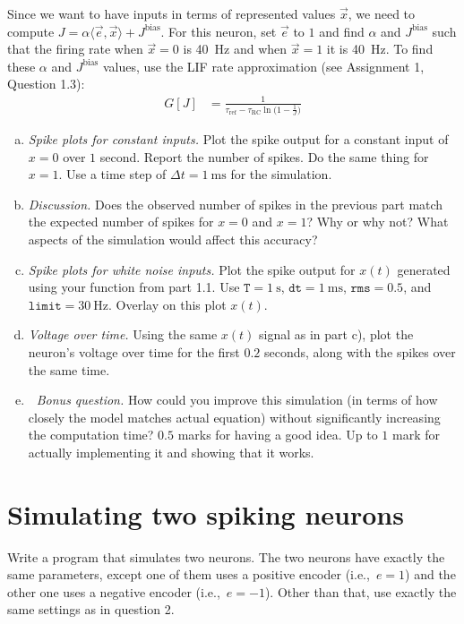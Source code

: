 	Since we want to have inputs in terms of represented values $\vec x$, we need to compute $J = \alpha \langle \vec e, \vec x \rangle + J^\mathrm{bias}$. For this neuron, set $\vec e$ to $1$ and find $\alpha$ and $J^\mathrm{bias}$ such that the firing rate when $\vec x=0$ is \SI{40}{\hertz} and when $\vec x=1$ it is \SI{40}{\hertz}. To find these $\alpha$ and $J^\mathrm{bias}$ values, use the LIF rate approximation (see Assignment 1, Question 1.3):
	\begin{align*}
		G[J] &= \frac{1}{\tau_\mathrm{ref} - \tau_\mathrm{RC} \ln \big( 1 - \frac{1}J \big)}
	\end{align*}

	\begin{enumerate}[a)]
		\item {} \textit{Spike plots for constant inputs.} Plot the spike output for a constant input of $x=0$ over $1$ second. Report the number of spikes. Do the same thing for $x=1$. Use a time step of $\Delta t = \SI{1}{\milli\second}$ for the simulation.
		\item {} \textit{Discussion.} Does the observed number of spikes in the previous part match the expected number of spikes for $x=0$ and $x=1$? Why or why not? What aspects of the simulation would affect this accuracy?
		\item {} \textit{Spike plots for white noise inputs.} Plot the spike output for $x(t)$ generated using your function from part 1.1. Use $\mathtt{T}=\SI{1}{\second}$, $\mathtt{dt}=\SI{1}{\milli\second}$, $\mathtt{rms}=0.5$, and $\mathtt{limit}=\SI{30}{\hertz}$. Overlay on this plot $x(t)$.
		\item {} \textit{Voltage over time.} Using the same $x(t)$ signal as in part c), plot the neuron's voltage over time for the first $0.2$ seconds, along with the spikes over the same time.
		\item {} \textit{{\symbolfont 🌟} Bonus question.} How could you improve this simulation (in terms of how closely the model matches actual equation) without significantly increasing the computation time? $0.5$ marks for having a good idea. Up to $1$ mark for actually implementing it and showing that it works.
	\end{enumerate}

	\section{Simulating two spiking neurons}

	Write a program that simulates two neurons. The two neurons have exactly the same parameters, except one of them uses a positive encoder (i.e.,~$e = 1$) and the other one uses a negative encoder (i.e.,~$e = -1$). Other than that, use exactly the same settings as in question 2.

